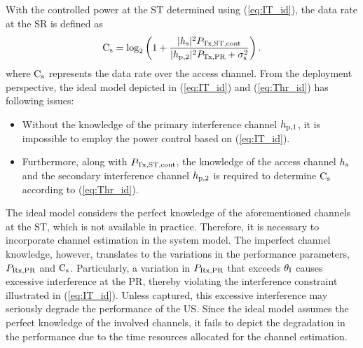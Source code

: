 With the controlled power at the ST determined using (\ref{eq:IT_id}), the data rate at the SR is defined as
\begin{equation}
\text{C}_{\text{s}} = \log_2 \left(1 + \frac{|h_{\text{s}}|^2 P_{\text{Tx,ST,cont}}}{ |h_{\text{p,2}}|^2 P_{\text{Tx,PR}} + \sigma^2_{\text{s}}} \right). 
\label{eq:Thr_id}
\end{equation}
where $\text{C}_{\text{s}}$ represents the data rate over the access channel. %
From the deployment perspective, the ideal model depicted in (\ref{eq:IT_id}) and (\ref{eq:Thr_id}) has following issues:
\begin{itemize}
\item Without the knowledge of the primary interference channel $h_{\text{p,1}}$, it is impossible to employ the power control based on (\ref{eq:IT_id}). 
\item Furthermore, along with $P_{\text{Tx,ST,cont}}$, the knowledge of the access channel $h_{\text{s}}$ and the secondary interference channel $h_{\text{p,2}}$ is required to determine $\text{C}_{\text{s}}$ according to (\ref{eq:Thr_id}).
\end{itemize}
The ideal model considers the perfect knowledge of the aforementioned channels at the ST, which is not available in practice. Therefore, it is necessary to incorporate channel estimation in the system model. The imperfect channel knowledge, however, translates to the variations in the performance parameters, $P_{\text{Rx,PR}}$ and $\text{C}_{\text{s}}$. Particularly, a variation in $P_{\text{Rx,PR}}$ that exceeds $\theta_{\text{I}}$ causes excessive interference at the PR, thereby violating the interference constraint illustrated in (\ref{eq:IT_id}). Unless captured, this excessive interference may seriously degrade the performance of the US. Since the ideal model assumes the perfect knowledge of the involved channels, it fails to depict the degradation in the performance due to the time resources allocated for the channel estimation. %

